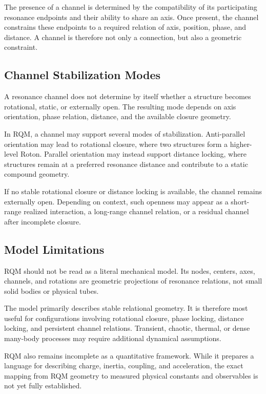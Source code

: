 \documentclass[11pt,a4paper]{article}
\begin{document}
The presence of a channel is determined by the compatibility of its participating resonance endpoints and their ability to share an axis. Once present, the channel constrains these endpoints to a required relation of axis, position, phase, and distance. A channel is therefore not only a connection, but also a geometric constraint.


\subsection{Channel Stabilization Modes}

A resonance channel does not determine by itself whether a structure becomes rotational, static, or externally open. The resulting mode depends on axis orientation, phase relation, distance, and the available closure geometry.

In RQM, a channel may support several modes of stabilization. Anti-parallel orientation may lead to rotational closure, where two structures form a higher-level Roton. Parallel orientation may instead support distance locking, where structures remain at a preferred resonance distance and contribute to a static compound geometry.

If no stable rotational closure or distance locking is available, the channel remains externally open. Depending on context, such openness may appear as a short-range realized interaction, a long-range channel relation, or a residual channel after incomplete closure.


\subsection{Model Limitations}

RQM should not be read as a literal mechanical model. Its nodes, centers, axes, channels, and rotations are geometric projections of resonance relations, not small solid bodies or physical tubes.

The model primarily describes stable relational geometry. It is therefore most useful for configurations involving rotational closure, phase locking, distance locking, and persistent channel relations. Transient, chaotic, thermal, or dense many-body processes may require additional dynamical assumptions.

RQM also remains incomplete as a quantitative framework. While it prepares a language for describing charge, inertia, coupling, and acceleration, the exact mapping from RQM geometry to measured physical constants and observables is not yet fully established.
\end{document}
